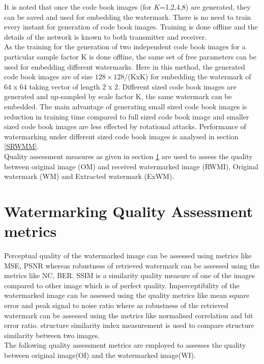  It is noted that once the code book images (for $K$=1,2,4,8) are generated, they can be saved and used for embedding the watermark. There is no need to train every instant for generation of code book images. Training is done offline and the  details of the network is known to both transmitter and receiver.  \\
 
 As the training for the generation of two independent code book images for a particular sample factor K is done offline, the same set of free parameters can be used for embedding different watermarks. Here in this method, the generated code book images are of size $128\times128$/(KxK) for embedding the watermark of $64$ x $64$ taking vector of length $2$ x $2$. Different sized code book images are generated and up-sampled by scale factor K, the same watermark can be embedded. The main advantage of generating small sized code book images is reduction in training time compared to full sized code book image and smaller sized code book images are less effected by rotational attacks. Performance of watermarking under different sized code book images is analysed in section \ref{SRWMM}.\\
 
 Quality assessment measures as given in section \ref{WMQAP} are used to assess the quality between original image (OM) and received watermarked image (RWMI), Original watermark (WM) and Extracted watermark (ExWM). 
 
\section{Watermarking Quality Assessment metrics}\label{WMQAP}
Perceptual quality of the watermarked image can be assessed using metrics like MSE, PSNR whereas robustness of retrieved watermark can be assessed using the metrics like NC, BER. SSIM is a similarity quality measure of one of the images compared to other image which is of perfect quality. Imperceptibility of the watermarked image can be assessed using the quality metrics like mean square error and peak signal to noise ratio where as robustness of the retrieved watermark can be assessed using the metrics like normalised correlation and bit error ratio. structure similarity index measurement is used to compare structure similarity between two images.\\

The following quality assessment metrics are employed to assesses the quality between original image(OI) and the watermarked image(WI).
